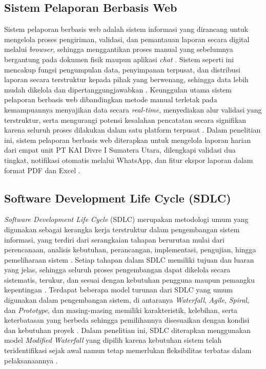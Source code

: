 \subsection{Sistem Pelaporan Berbasis Web} \label{II.SistemPelaporan}
Sistem pelaporan berbasis web adalah sistem informasi yang dirancang untuk mengelola proses pengiriman, validasi, dan pemantauan laporan secara digital melalui \textit{browser}, sehingga menggantikan proses manual yang sebelumnya bergantung pada dokumen fisik maupun aplikasi \textit{chat} \cite{zikra2025webinfo}. Sistem seperti ini mencakup fungsi pengumpulan data, penyimpanan terpusat, dan distribusi laporan secara terstruktur kepada pihak yang berwenang, sehingga data lebih mudah dikelola dan dipertanggungjawabkan \cite{zikra2025webinfo}. Keunggulan utama sistem pelaporan berbasis web dibandingkan metode manual terletak pada kemampuannya menyajikan data secara \textit{real-time}, menyediakan alur validasi yang terstruktur, serta mengurangi potensi kesalahan pencatatan secara signifikan karena seluruh proses dilakukan dalam satu platform terpusat \cite{cahyo2026mbg}. Dalam penelitian ini, sistem pelaporan berbasis web diterapkan untuk mengelola laporan harian dari empat unit PT KAI Divre I Sumatera Utara, dilengkapi validasi dua tingkat, notifikasi otomatis melalui WhatsApp, dan fitur ekspor laporan dalam format PDF dan Excel \cite{nugroho2025monitoring}. \par

\subsection{Software Development Life Cycle (SDLC)} \label{II.SDLC}
\textit{Software Development Life Cycle} (SDLC) merupakan metodologi umum yang digunakan sebagai kerangka kerja terstruktur dalam pengembangan sistem informasi, yang terdiri dari serangkaian tahapan berurutan mulai dari perencanaan, analisis kebutuhan, perancangan, implementasi, pengujian, hingga pemeliharaan sistem \cite{andryadi2025sdlc}. Setiap tahapan dalam SDLC memiliki tujuan dan luaran yang jelas, sehingga seluruh proses pengembangan dapat dikelola secara sistematis, terukur, dan sesuai dengan kebutuhan pengguna maupun pemangku kepentingan \cite{andryadi2025sdlc}. Terdapat beberapa model turunan dari SDLC yang umum digunakan dalam pengembangan sistem, di antaranya \textit{Waterfall}, \textit{Agile}, \textit{Spiral}, dan \textit{Prototype}, dan masing-masing memiliki karakteristik, kelebihan, serta keterbatasan yang berbeda sehingga pemilihannya disesuaikan dengan kondisi dan kebutuhan proyek \cite{andryadi2025sdlc}. Dalam penelitian ini, SDLC diterapkan menggunakan model \textit{Modified Waterfall} yang dipilih karena kebutuhan sistem telah teridentifikasi sejak awal namun tetap memerlukan fleksibilitas terbatas dalam pelaksanaannya \cite{andryadi2025sdlc}. \par

